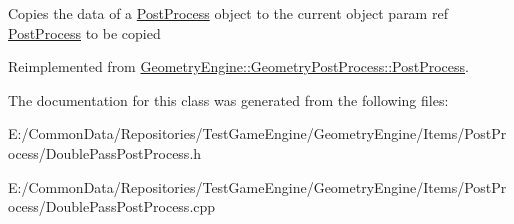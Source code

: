 Copies the data of a \mbox{\hyperlink{class_geometry_engine_1_1_geometry_post_process_1_1_post_process}{Post\+Process}} object to the current object param ref \mbox{\hyperlink{class_geometry_engine_1_1_geometry_post_process_1_1_post_process}{Post\+Process}} to be copied 

Reimplemented from \mbox{\hyperlink{class_geometry_engine_1_1_geometry_post_process_1_1_post_process_aba093c175b228894204e785a5a54e6e9}{Geometry\+Engine\+::\+Geometry\+Post\+Process\+::\+Post\+Process}}.



The documentation for this class was generated from the following files\+:\begin{DoxyCompactItemize}
\item 
E\+:/\+Common\+Data/\+Repositories/\+Test\+Game\+Engine/\+Geometry\+Engine/\+Items/\+Post\+Process/Double\+Pass\+Post\+Process.\+h\item 
E\+:/\+Common\+Data/\+Repositories/\+Test\+Game\+Engine/\+Geometry\+Engine/\+Items/\+Post\+Process/Double\+Pass\+Post\+Process.\+cpp\end{DoxyCompactItemize}
